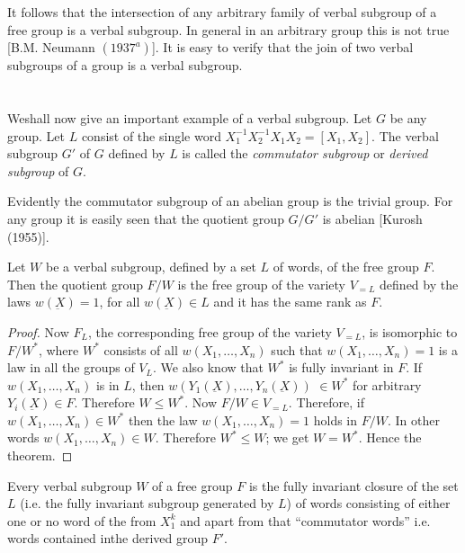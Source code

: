 It follows that the intersection of any arbitrary family of verbal
subgroup of a free group is a verbal subgroup. In general in an
arbitrary group this is not true [B.M. Neumann $(1937^a)$]. It is easy
to verify that the join of two verbal subgroups of a group is a verbal
subgroup. 

\section{}\label{chap5:sec8}%

We\pageoriginale shall now give an important example of a verbal subgroup. Let $G$ be
any group. Let $L$ consist of the single word $X^{-1}_1 X^{-1}_2 X_1
X_2 = [X_1, X_2]$. The verbal subgroup $G'$ of $G$ defined by $L$ is
called the \textit{commutator subgroup} or \textit{derived subgroup}
of $G$. 
  
Evidently the commutator subgroup of an abelian group is the trivial
group. For any group it is easily seen that the quotient group $G/G'$
is abelian [Kurosh (1955)]. 
  
\begin{theorem}\label{chap5:sec8:thm5}%
  Let $W$ be a verbal subgroup, defined by a set $L$ of words, of the
  free group $F$. Then the quotient group $F/W$ is the free group of
  the variety $V_{=L}$ defined by the laws $w(\underbar{X})=1$, for
  all $w(\underbar{X}) \in  L$ and it has the same rank as
  $F$. 
\end{theorem}  
  
\begin{proof}
  Now $F_L$, the corresponding free group of the variety $V_{=L}$, is
  isomorphic to $F/W^*$, where $W^*$ consists of all $w(X_1, \ldots,
  X_n)$ such that $w(X_1 , \ldots , X_n)=1$ is a law in all the groups
  of $V_L$. We also know that $W^*$ is fully invariant in $F$. If $w(X_1,\ldots,
  X_n)$ is in $L$, then $w(Y_1(\underbar{X}), \ldots,Y_n(\underbar{X}))$
  $\in  W^*$ for arbitrary $Y_i (\underbar{X}) \in 
  F$. Therefore $W \leq W^*$. Now $F/W \in  V_{=L}$. Therefore,
  if $w(X_1, \ldots, X_n) \in  W^*$ then the law $w(X_1,\ldots
 ,  X_n)=1$ holds in $F/W$. In other words $w(X_1,\ldots,X_n)
  \in  W$. Therefore $W^* \leq W$; we get $W = W^*$. Hence the
  theorem. 
\end{proof}  
  
\begin{theorem}\label{chap5:sec8:thm6}%
  Every verbal subgroup $W$ of a free group $F$ is the fully invariant
  closure of the set $L$ (i.e. the fully invariant subgroup generated
  by $L$) of words consisting of either one or no word of the from
  $X^k_1$ and apart from that ``commutator words'' i.e. words contained
  in\pageoriginale the derived group $F'$. 
\end{theorem}  
  
